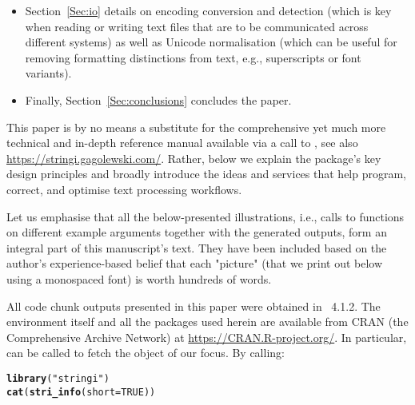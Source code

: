 \documentclass[nojss]{jss}\usepackage[]{graphicx}\usepackage[]{xcolor}
\makeatletter
\newcommand{\hlnum}[1]{\textcolor[rgb]{0.686,0.059,0.569}{#1}}%
\newcommand{\hlstr}[1]{\textcolor[rgb]{0.192,0.494,0.8}{#1}}%
\newcommand{\hlstd}[1]{\textcolor[rgb]{0.345,0.345,0.345}{#1}}%
\newcommand{\hlkwc}[1]{\textcolor[rgb]{0.333,0.667,0.333}{#1}}%
\newcommand{\hlkwd}[1]{\textcolor[rgb]{0.737,0.353,0.396}{\textbf{#1}}}%
\newenvironment{kframe}{%
 \def\at@end@of@kframe{}%
 \ifinner\ifhmode%
  \def\at@end@of@kframe{\end{minipage}}%
  \begin{minipage}{\columnwidth}%
 \fi\fi%
 \def\FrameCommand##1{\hskip\@totalleftmargin \hskip-\fboxsep
 \colorbox{shadecolor}{##1}\hskip-\fboxsep
     \hskip-\linewidth \hskip-\@totalleftmargin \hskip\columnwidth}%
 \MakeFramed {\advance\hsize-\width
   \@totalleftmargin\z@ \linewidth\hsize
   \@setminipage}}%
 {\par\unskip\endMakeFramed%
 \at@end@of@kframe}
\newenvironment{knitrout}{}{} %
\makeatother
\begin{document}
\begin{itemize}
\item Section~\ref{Sec:io} details on encoding conversion and detection
(which is key when reading or writing text files that are to be communicated
across different systems) as well as Unicode normalisation
(which can be useful for removing formatting
distinctions from text, e.g., superscripts or font variants).

\item Finally, Section~\ref{Sec:conclusions} concludes the paper.
\end{itemize}



This paper is by no means a substitute for the comprehensive yet much
more technical and in-depth reference manual available via a call to
, see also
\url{https://stringi.gagolewski.com/}. Rather, below we explain
the package's key design principles and broadly introduce the ideas and
services that help program, correct, and optimise text processing workflows.

Let us emphasise that all the below-presented illustrations,
i.e., calls to  functions on different
example arguments together with the generated outputs, form an integral
part of this manuscript's text. They have been included based on
the author's experience-based belief that each "picture" (that we print
out below using a monospaced font) is worth hundreds of words.











\medskip
All code chunk outputs presented in this paper were obtained in
~4.1.2.
The  environment itself and all the packages used herein
are available from CRAN (the Comprehensive  Archive Network)
at \url{https://CRAN.R-project.org/}.
In particular,  can be called to
fetch the object of our focus.
By calling:


\begin{knitrout}
\color{fgcolor}\begin{kframe}
\begin{alltt}
\hlkwd{library}\hlstd{(}\hlstr{"stringi"}\hlstd{)}
\hlkwd{cat}\hlstd{(}\hlkwd{stri_info}\hlstd{(}\hlkwc{short}\hlstd{=}\hlnum{TRUE}\hlstd{))}
\end{alltt}
\end{kframe}
\end{knitrout}
\end{document}
